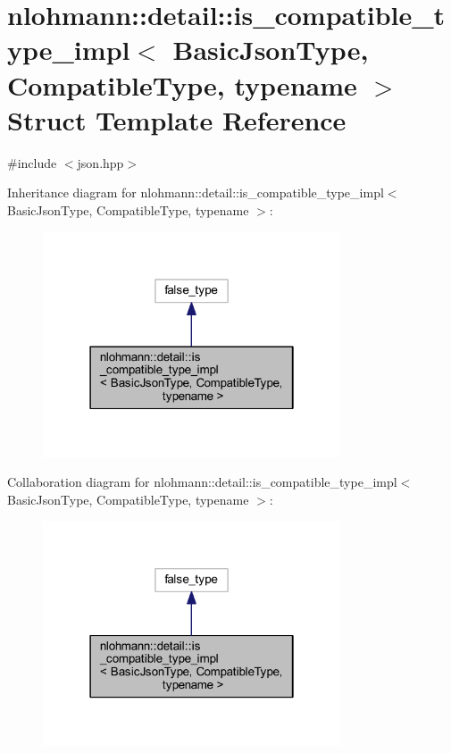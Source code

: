\hypertarget{structnlohmann_1_1detail_1_1is__compatible__type__impl}{}\section{nlohmann\+::detail\+::is\+\_\+compatible\+\_\+type\+\_\+impl$<$ Basic\+Json\+Type, Compatible\+Type, typename $>$ Struct Template Reference}
\label{structnlohmann_1_1detail_1_1is__compatible__type__impl}


{\ttfamily \#include $<$json.\+hpp$>$}



Inheritance diagram for nlohmann\+::detail\+::is\+\_\+compatible\+\_\+type\+\_\+impl$<$ Basic\+Json\+Type, Compatible\+Type, typename $>$\+:
\nopagebreak
\begin{figure}[H]
\begin{center}
\leavevmode
\includegraphics[width=250pt]{structnlohmann_1_1detail_1_1is__compatible__type__impl__inherit__graph}
\end{center}
\end{figure}


Collaboration diagram for nlohmann\+::detail\+::is\+\_\+compatible\+\_\+type\+\_\+impl$<$ Basic\+Json\+Type, Compatible\+Type, typename $>$\+:
\nopagebreak
\begin{figure}[H]
\begin{center}
\leavevmode
\includegraphics[width=250pt]{structnlohmann_1_1detail_1_1is__compatible__type__impl__coll__graph}
\end{center}
\end{figure}


